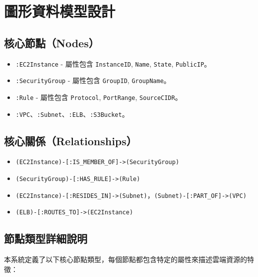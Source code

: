 \documentclass[11pt,a4paper]{ctexart}
\begin{document}
\section{圖形資料模型設計}

\subsection{核心節點（Nodes）}
\begin{itemize}[leftmargin=1.5em]
\item \texttt{:EC2Instance} - 屬性包含 \texttt{InstanceID}, \texttt{Name}, \texttt{State}, \texttt{PublicIP}。
\item \texttt{:SecurityGroup} - 屬性包含 \texttt{GroupID}, \texttt{GroupName}。
\item \texttt{:Rule} - 屬性包含 \texttt{Protocol}, \texttt{PortRange}, \texttt{SourceCIDR}。
\item \texttt{:VPC}、\texttt{:Subnet}、\texttt{:ELB}、\texttt{:S3Bucket}。
\end{itemize}

\subsection{核心關係（Relationships）}
\begin{itemize}[leftmargin=1.5em]
\item \texttt{(EC2Instance)-[:IS\_MEMBER\_OF]->(SecurityGroup)}
\item \texttt{(SecurityGroup)-[:HAS\_RULE]->(Rule)}
\item \texttt{(EC2Instance)-[:RESIDES\_IN]->(Subnet)}，\texttt{(Subnet)-[:PART\_OF]->(VPC)}
\item \texttt{(ELB)-[:ROUTES\_TO]->(EC2Instance)}
\end{itemize}

\subsection{節點類型詳細說明}

本系統定義了以下核心節點類型，每個節點都包含特定的屬性來描述雲端資源的特徵：
\end{document}
